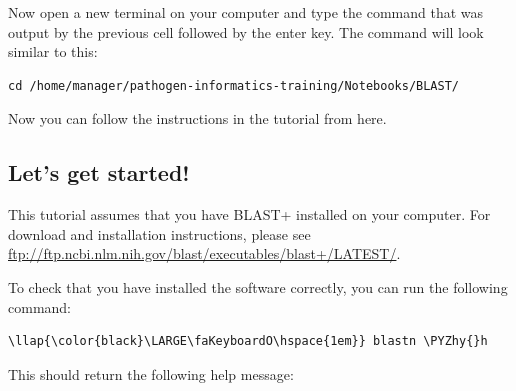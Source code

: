\documentclass[11pt]{article}
\def\PYZhy{\char`\-}
\begin{document}
    Now open a new terminal on your computer and type the command that was
output by the previous cell followed by the enter key. The command will
look similar to this:

\begin{verbatim}
cd /home/manager/pathogen-informatics-training/Notebooks/BLAST/
\end{verbatim}

Now you can follow the instructions in the tutorial from here.

\hypertarget{lets-get-started}{%
\subsection{Let's get started!}\label{lets-get-started}}

This tutorial assumes that you have BLAST+ installed on your computer.
For download and installation instructions, please see
\url{ftp://ftp.ncbi.nlm.nih.gov/blast/executables/blast+/LATEST/}.

To check that you have installed the software correctly, you can run the
following command:

\begin{terminalinput}
\begin{Verbatim}[commandchars=\\\{\}]
\llap{\color{black}\LARGE\faKeyboardO\hspace{1em}} blastn \PYZhy{}h
\end{Verbatim}
\end{terminalinput}

    This should return the following help message:
\end{document}
